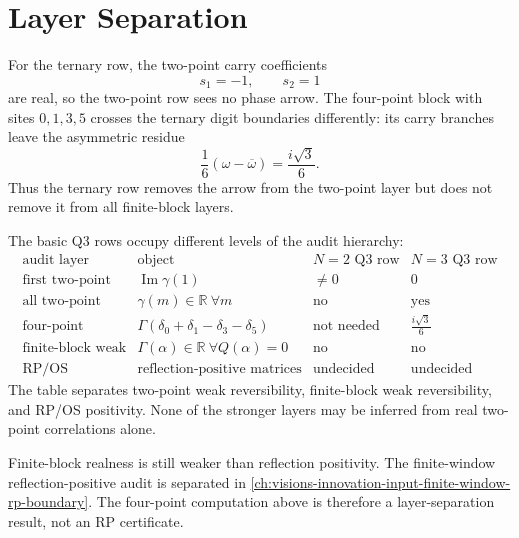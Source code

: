 \section{Layer Separation}
\label{sec:innovation-input-finite-block-layer-separation}

\begin{principle}
\label{prin:innovation-input-chirality-moves-upward}
For the ternary row, the two-point carry coefficients
$$
s_1=-1,
\qquad
s_2=1
$$
are real, so the two-point row sees no phase arrow. The four-point block
with sites $0,1,3,5$ crosses the ternary digit boundaries differently:
its carry branches leave the asymmetric residue
$$
\frac16(\omega-\overline\omega)=\frac{i\sqrt3}{6}.
$$
Thus the ternary row removes the arrow from the two-point layer but does
not remove it from all finite-block layers.
\end{principle}

\begin{principle}
\label{prin:innovation-input-reversibility-audit-table}
The basic Q3 rows occupy different levels of the audit hierarchy:
$$
\begin{array}{c|c|c|c}
\text{audit layer} & \text{object} & N=2\text{ Q3 row} & N=3\text{ Q3 row}\\
\hline
\text{first two-point} &
\operatorname{Im}\gamma(1) &
\ne0 &
0\\
\text{all two-point} &
\gamma(m)\in\mathbb R\ \forall m &
\text{no} &
\text{yes}\\
\text{four-point} &
\Gamma(\delta_0+\delta_1-\delta_3-\delta_5) &
\text{not needed} &
\frac{i\sqrt3}{6}\\
\text{finite-block weak} &
\Gamma(\alpha)\in\mathbb R\ \forall Q(\alpha)=0 &
\text{no} &
\text{no}\\
\text{RP/OS} &
\text{reflection-positive matrices} &
\text{undecided} &
\text{undecided}
\end{array}
$$
The table separates two-point weak reversibility, finite-block weak
reversibility, and RP/OS positivity. None of the stronger layers may be
inferred from real two-point correlations alone.
\end{principle}

\begin{principle}
\label{prin:innovation-input-finite-block-rp-boundary}
Finite-block realness is still weaker than reflection positivity. The
finite-window reflection-positive audit is separated in
\autoref{ch:visions-innovation-input-finite-window-rp-boundary}. The
four-point computation above is therefore a layer-separation result, not
an RP certificate.
\end{principle}
